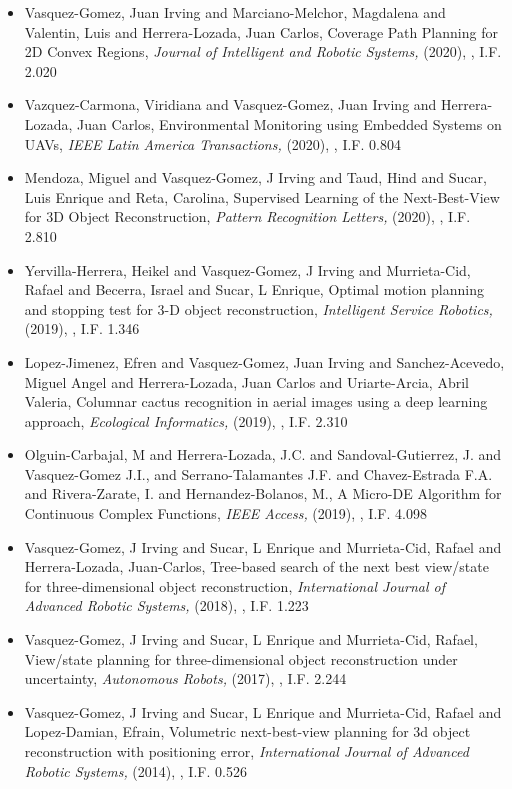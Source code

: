 \begin{itemize}
\item Vasquez-Gomez, Juan Irving and Marciano-Melchor, Magdalena and Valentin, Luis and Herrera-Lozada, Juan Carlos, Coverage Path Planning for 2D Convex Regions,\textit{ Journal of Intelligent and Robotic Systems,} (2020), \href{https://doi.org/10.1007/s10846-019-01024-y} {\faFilePdfO}, I.F. 2.020 
\item Vazquez-Carmona, Viridiana and Vasquez-Gomez, Juan Irving and Herrera-Lozada, Juan Carlos, Environmental Monitoring using Embedded Systems on UAVs,\textit{ IEEE Latin America Transactions,} (2020), \href{https://doi.org/10.1109/TLA.2020.9085284} {\faFilePdfO}, I.F. 0.804 
\item Mendoza, Miguel and Vasquez-Gomez, J Irving and Taud, Hind and Sucar, Luis Enrique and Reta, Carolina, Supervised Learning of the Next-Best-View for 3D Object Reconstruction,\textit{ Pattern Recognition Letters,} (2020), \href{https://doi.org/10.1016/j.patrec.2020.02.024} {\faFilePdfO}, I.F. 2.810 
\item Yervilla-Herrera, Heikel and Vasquez-Gomez, J Irving and Murrieta-Cid, Rafael and Becerra, Israel and Sucar, L Enrique, Optimal motion planning and stopping test for 3-D object reconstruction,\textit{ Intelligent Service Robotics,} (2019), \href{https://doi.org/10.1007/s11370-018-0264-y} {\faFilePdfO}, I.F. 1.346 
\item Lopez-Jimenez, Efren and Vasquez-Gomez, Juan Irving and Sanchez-Acevedo, Miguel Angel and Herrera-Lozada, Juan Carlos and Uriarte-Arcia, Abril Valeria, Columnar cactus recognition in aerial images using a deep learning approach,\textit{ Ecological Informatics,} (2019), \href{https://doi.org/10.1016/j.ecoinf.2019.05.005} {\faFilePdfO}, I.F. 2.310 
\item Olguin-Carbajal, M and Herrera-Lozada, J.C. and Sandoval-Gutierrez, J. and Vasquez-Gomez J.I., and Serrano-Talamantes J.F. and Chavez-Estrada F.A. and Rivera-Zarate, I. and Hernandez-Bolanos, M., A Micro-DE Algorithm for Continuous Complex Functions,\textit{ IEEE Access,} (2019), \href{https://doi.org/10.1109/ACCESS.2019.2954296} {\faFilePdfO}, I.F. 4.098 
\item Vasquez-Gomez, J Irving and Sucar, L Enrique and Murrieta-Cid, Rafael and Herrera-Lozada, Juan-Carlos, Tree-based search of the next best view/state for three-dimensional object reconstruction,\textit{ International Journal of Advanced Robotic Systems,} (2018), \href{https://journals.sagepub.com/doi/10.1177/1729881418754575} {\faFilePdfO}, I.F. 1.223 
\item Vasquez-Gomez, J Irving and Sucar, L Enrique and Murrieta-Cid, Rafael, View/state planning for three-dimensional object reconstruction under uncertainty,\textit{ Autonomous Robots,} (2017), \href{https://doi.org/10.1007/s10514-015-9531-3} {\faFilePdfO}, I.F. 2.244 
\item Vasquez-Gomez, J Irving and Sucar, L Enrique and Murrieta-Cid, Rafael and Lopez-Damian, Efrain, Volumetric next-best-view planning for 3d object reconstruction with positioning error,\textit{ International Journal of Advanced Robotic Systems,} (2014), \href{https://doi.org/10.5772%2F58759} {\faFilePdfO}, I.F. 0.526 
\end{itemize} 
